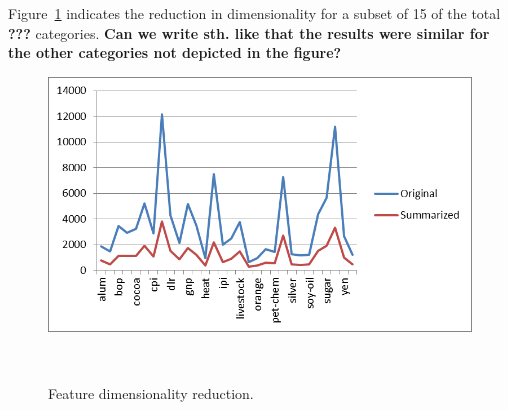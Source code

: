 \documentclass{sigchi}
\begin{document}
Figure~\ref{figureDimensionalityReduction} indicates the reduction in dimensionality for a subset of 15 of the total \textbf{???} categories. \textbf{Can we write sth. like that the results were similar for the other categories not depicted in the figure?}
\begin{figure}
\centering
  \includegraphics[width=0.9\columnwidth]{figures/DocumentClassificationAzadehDorna-000}
  \caption{Feature dimensionality reduction. }~\label{figureDimensionalityReduction}
\end{figure}
\end{document}

